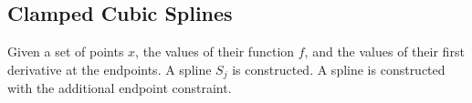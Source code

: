 \documentclass[10pt]{article}
\numberwithin{equation}{subsection}
\begin{document}
            

        \subsection{Clamped Cubic Splines}

            Given a set of points $x$, the values of their function $f$, and
            the values of their first derivative at the endpoints. A
            spline $S_j$ is constructed. A spline is constructed with the
            additional endpoint constraint.

            
\end{document}

